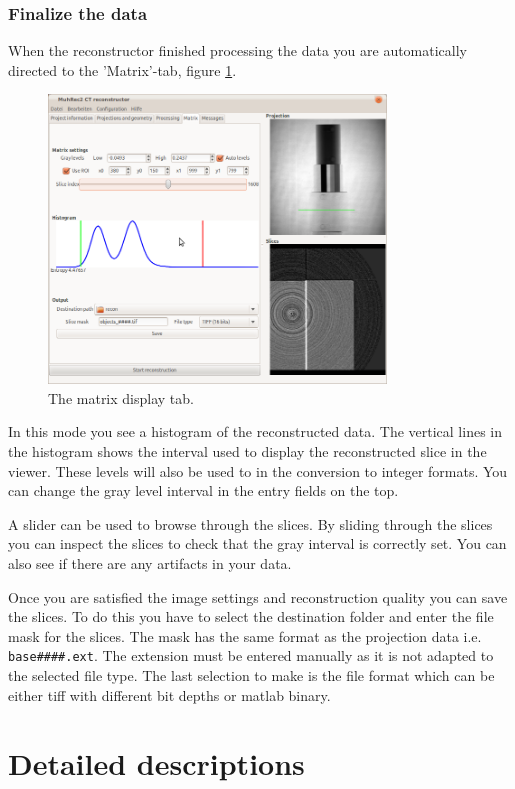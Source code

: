 \documentclass[a4paper]{scrreprt}
\begin{document}
\subsection{Finalize the data}
When the reconstructor finished processing the data you are automatically
directed to the 'Matrix'-tab, figure \ref{fig_matrixtab}.
\begin{figure}
 \centering
\includegraphics[width=0.8\textwidth]{figures/MatrixTab.png}
\caption{The matrix display tab.}\label{fig_matrixtab}
\end{figure}


In this mode you see a histogram of the
reconstructed data. The vertical lines in the histogram shows the interval used
to display the reconstructed slice in the viewer. These levels will also be used
to in the conversion to integer formats. You can change the gray level interval
in the entry fields on the top.

A slider can be used to browse through the slices. By sliding through the slices
you can inspect the slices to check that the gray interval is correctly set. You
can also see if there are any artifacts in your data.

Once you are satisfied the image settings and reconstruction quality you can
save the slices. To do this you have to select the destination folder and enter
the file mask for the slices. The mask has the same format as the projection
data i.e. \verb+base####.ext+. The extension must be entered manually as it is
not adapted to the selected file type. The last selection to make is the file
format which can be either tiff with different bit depths or matlab binary.

\chapter{Detailed descriptions}
\end{document}

